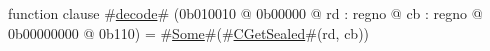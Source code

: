 function clause #\hyperref[zdecode]{decode}# (0b010010 @ 0b00000 @ rd : regno @ cb : regno @ 0b00000000 @ 0b110) = #\hyperref[zSome]{Some}#(#\hyperref[zCGetSealed]{CGetSealed}#(rd, cb))
